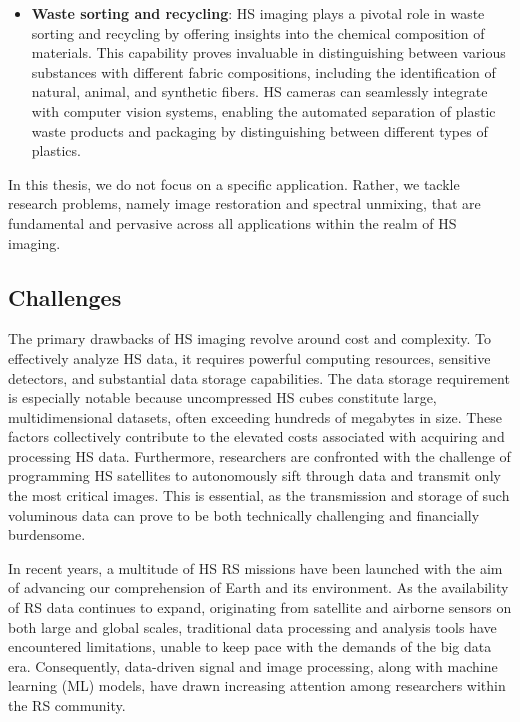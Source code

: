 \begin{itemize}
    
    \item \textbf{Waste sorting and recycling}: HS imaging plays a pivotal role in waste sorting and recycling by offering insights into the chemical composition of materials. 
    This capability proves invaluable in distinguishing between various substances with different fabric compositions, including the identification of natural, animal, and synthetic fibers.
    HS cameras can seamlessly integrate with computer vision systems, enabling the automated separation of plastic waste products and packaging by distinguishing between different types of plastics.
    
\end{itemize}

In this thesis, we do not focus on a specific application.
Rather, we tackle research problems, namely image restoration and spectral unmixing, that are fundamental and pervasive across all applications within the realm of HS imaging.

\subsection{Challenges}

The primary drawbacks of HS imaging revolve around cost and complexity.
To effectively analyze HS data, it requires powerful computing resources, sensitive detectors, and substantial data storage capabilities.
The data storage requirement is especially notable because uncompressed HS cubes constitute large, multidimensional datasets, often exceeding hundreds of megabytes in size.
These factors collectively contribute to the elevated costs associated with acquiring and processing HS data.
Furthermore, researchers are confronted with the challenge of programming HS satellites to autonomously sift through data and transmit only the most critical images.
This is essential, as the transmission and storage of such voluminous data can prove to be both technically challenging and financially burdensome.

In recent years, a multitude of HS RS missions have been launched with the aim of advancing our comprehension of Earth and its environment.
As the availability of RS data continues to expand, originating from satellite and airborne sensors on both large and global scales, traditional data processing and analysis tools have encountered limitations, unable to keep pace with the demands of the big data era.
Consequently, data-driven signal and image processing, along with machine learning (ML) models, have drawn increasing attention among researchers within the RS community.


